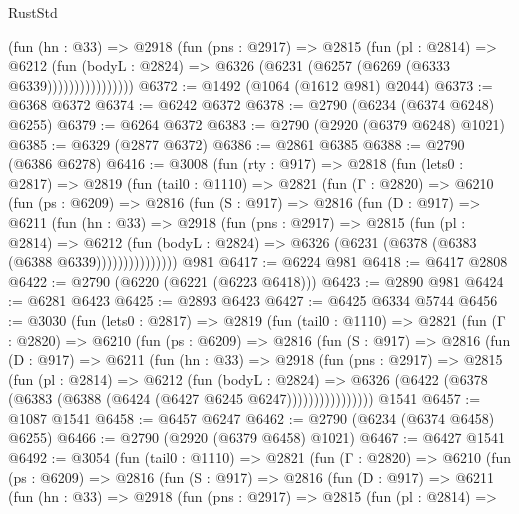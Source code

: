 \begin{lexlean}{RustStd}
\begin{coremodule}
                    (fun (hn : @33) =>
                    @2918
                      (fun (pns : @2917) =>
                      @2815
                        (fun (pl : @2814) =>
                        @6212
                          (fun (bodyL : @2824) =>
                          @6326 (@6231 (@6257 (@6269 (@6333 @6339))))))))))))))))
@6372 := @1492 (@1064 (@1612 @981) @2044)
@6373 := @6368 @6372
@6374 := @6242 @6372
@6378 := @2790 (@6234 (@6374 @6248) @6255)
@6379 := @6264 @6372
@6383 := @2790 (@2920 (@6379 @6248) @1021)
@6385 := @6329 (@2877 @6372)
@6386 := @2861 @6385
@6388 := @2790 (@6386 @6278)
@6416 := @3008
    (fun (rty : @917) =>
    @2818
      (fun (lets0 : @2817) =>
      @2819
        (fun (tail0 : @1110) =>
        @2821
          (fun (Γ : @2820) =>
          @6210
            (fun (ps : @6209) =>
            @2816
              (fun (S : @917) =>
              @2816
                (fun (D : @917) =>
                @6211
                  (fun (hn : @33) =>
                  @2918
                    (fun (pns : @2917) =>
                    @2815
                      (fun (pl : @2814) =>
                      @6212
                        (fun (bodyL : @2824) =>
                        @6326 (@6231 (@6378 (@6383 (@6388 @6339)))))))))))))))
    @981
@6417 := @6224 @981
@6418 := @6417 @2808
@6422 := @2790 (@6220 (@6221 (@6223 @6418)))
@6423 := @2890 @981
@6424 := @6281 @6423
@6425 := @2893 @6423
@6427 := @6425 @6334 @5744
@6456 := @3030
    (fun (lets0 : @2817) =>
    @2819
      (fun (tail0 : @1110) =>
      @2821
        (fun (Γ : @2820) =>
        @6210
          (fun (ps : @6209) =>
          @2816
            (fun (S : @917) =>
            @2816
              (fun (D : @917) =>
              @6211
                (fun (hn : @33) =>
                @2918
                  (fun (pns : @2917) =>
                  @2815
                    (fun (pl : @2814) =>
                    @6212
                      (fun (bodyL : @2824) =>
                      @6326 (@6422 (@6378 (@6383 (@6388 (@6424 (@6427 @6245 @6247))))))))))))))))
    @1541
@6457 := @1087 @1541
@6458 := @6457 @6247
@6462 := @2790 (@6234 (@6374 @6458) @6255)
@6466 := @2790 (@2920 (@6379 @6458) @1021)
@6467 := @6427 @1541
@6492 := @3054
    (fun (tail0 : @1110) =>
    @2821
      (fun (Γ : @2820) =>
      @6210
        (fun (ps : @6209) =>
        @2816
          (fun (S : @917) =>
          @2816
            (fun (D : @917) =>
            @6211
              (fun (hn : @33) =>
              @2918
                (fun (pns : @2917) =>
                @2815
                  (fun (pl : @2814) =>

\end{coremodule}
\end{lexlean}
